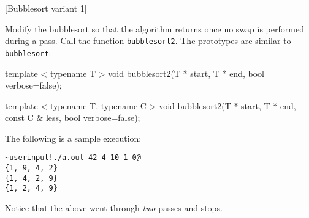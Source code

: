 [Bubblesort variant 1]

Modify the bubblesort so that the algorithm returns once
no swap is performed during a pass.
Call the function \verb!bubblesort2!.
The prototypes are similar to \verb!bubblesort!:
\begin{console}[frame=single, fontsize=\footnotesize]
template < typename T >
void bubblesort2(T * start, T * end, bool verbose=false);

template < typename T, typename C >
void bubblesort2(T * start, T * end, const C & less, bool verbose=false);
\end{console}

The following is a sample execution:
\begin{Verbatim}[frame=single,commandchars=\~\!\@,fontsize=\footnotesize]
~userinput!./a.out 42 4 10 1 0@
{1, 9, 4, 2}
{1, 4, 2, 9}
{1, 2, 4, 9}
\end{Verbatim}
Notice that the above went through \textit{two} passes and stops.
